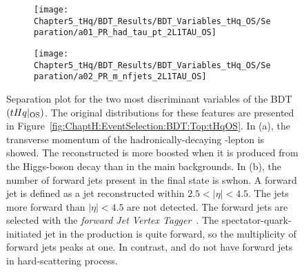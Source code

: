 \begin{figure}[h]
\centering
\begin{subfigure}{.47\textwidth}
  \centering
  \texttt{[image: Chapter5\_tHq/BDT\_Results/BDT\_Variables\_tHq\_OS/Separation/a01\_PR\_had\_tau\_pt\_2L1TAU\_OS]}
  \caption{}
\end{subfigure}%
\begin{subfigure}{.47\textwidth}
  \centering
  \texttt{[image: Chapter5\_tHq/BDT\_Results/BDT\_Variables\_tHq\_OS/Separation/a02\_PR\_m\_nfjets\_2L1TAU\_OS]}
  \caption{}
\end{subfigure}
\caption{Separation plot for the two most discriminant variables of the BDT$(tHq|_{\text{OS}})$.
The original distributions for these features are presented in Figure~\ref{fig:ChaptH:EventSelection:BDT:Top:tHqOS}.
In (a), the transverse momentum of the hadronically-decaying \Ptau-lepton is showed.
The reconstructed \tauhad is more boosted when it is produced from the Higgs-boson decay than in the main backgrounds. In (b), the number of forward jets present in the final state is swhon. A forward jet
is defined as a jet reconstructed within $2.5 < |\eta| < 4.5$.  The jets more forward than $|\eta| < 4.5$ are
not detected.
The forward jets are selected with the \textit{forward Jet Vertex Tagger}~\cite{ATLAS:2017ywy}.
The spectator-quark-initiated jet in the \tHq production is quite forward, so the multiplicity of forward jets peaks at one. 
In contrast, \ttbar and \Zjets do not have forward jets in hard-scattering process. }
\label{fig:Appendix:BDTVARS:tHqOS:BestTwo}
\end{figure}




